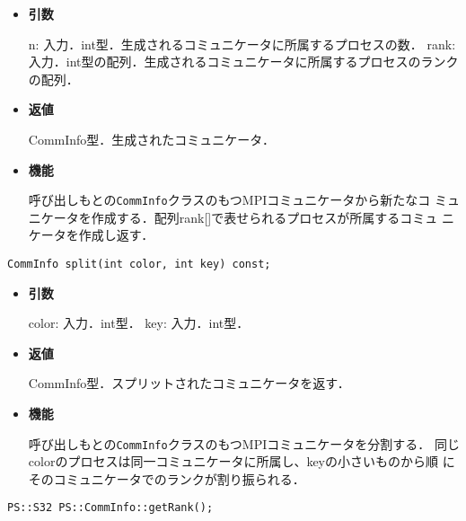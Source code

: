 \begin{itemize}

\item {\bf 引数}

n: 入力．int型．生成されるコミュニケータに所属するプロセスの数．
rank: 入力．int型の配列．生成されるコミュニケータに所属するプロセスのランクの配列．

\item {\bf 返値}

CommInfo型．生成されたコミュニケータ．

\item {\bf 機能}

呼び出しもとの{\tt CommInfo}クラスのもつMPIコミュニケータから新たなコ
ミュニケータを作成する．配列rank[]で表せられるプロセスが所属するコミュ
ニケータを作成し返す．

\end{itemize}

\begin{screen}
\begin{verbatim}
CommInfo split(int color, int key) const;
\end{verbatim}
\end{screen}

\begin{itemize}

\item {\bf 引数}

color: 入力．int型．
key: 入力．int型．

\item {\bf 返値}

CommInfo型．スプリットされたコミュニケータを返す．

\item {\bf 機能}

呼び出しもとの{\tt CommInfo}クラスのもつMPIコミュニケータを分割する．
同じcolorのプロセスは同一コミュニケータに所属し、keyの小さいものから順
にそのコミュニケータでのランクが割り振られる．

\end{itemize}




\begin{screen}
\begin{verbatim}
PS::S32 PS::CommInfo::getRank();
\end{verbatim}
\end{screen}

